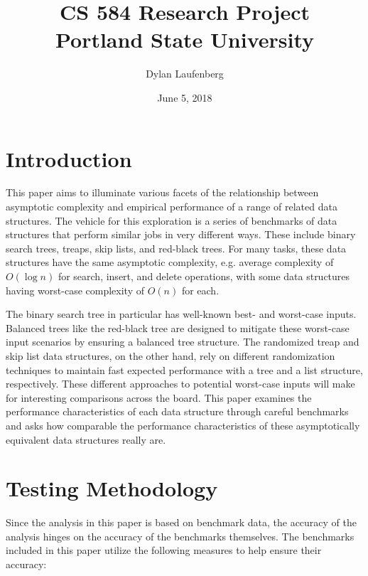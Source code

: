 \documentclass{article}
\title{CS 584 Research Project \\ \large Portland State University}
\author{ Dylan Laufenberg }
\date{June 5, 2018}
\begin{document}
\maketitle


\section{Introduction}
This paper aims to illuminate various facets of the relationship between asymptotic complexity and empirical performance of a range of related data structures. The vehicle for this exploration is a series of benchmarks of data structures that perform similar jobs in very different ways. These include binary search trees, treaps, skip lists, and red-black trees. For many tasks, these data structures have the same asymptotic complexity, e.g. average complexity of $O(\log n)$ for search, insert, and delete operations, with some data structures having worst-case complexity of $O(n)$ for each. 

The binary search tree in particular has well-known best- and worst-case inputs. Balanced trees like the red-black tree are designed to mitigate these worst-case input scenarios by ensuring a balanced tree structure. The randomized treap and skip list data structures, on the other hand, rely on different randomization techniques to maintain fast expected performance with a tree and a list structure, respectively. These different approaches to potential worst-case inputs will make for interesting comparisons across the board. This paper examines the performance characteristics of each data structure through careful benchmarks and asks how comparable the performance characteristics of these asymptotically equivalent data structures really are.

\section{Testing Methodology}
Since the analysis in this paper is based on benchmark data, the accuracy of the analysis hinges on the accuracy of the benchmarks themselves. The benchmarks included in this paper utilize the following measures to help ensure their accuracy:
\end{document}

